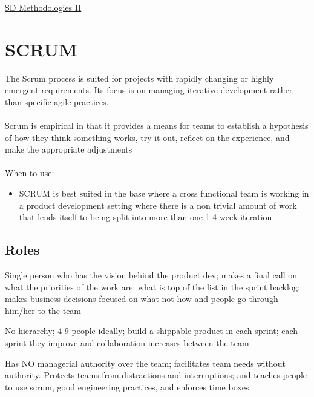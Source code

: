 \documentclass{article}[18pt]
\begin{document}
\begin{center}
\underline{\huge SD Methodologies II}
\end{center}
\section{SCRUM}
The Scrum process is suited for projects with rapidly changing or highly emergent requirements. Its focus is on managing iterative development rather than specific agile practices.\\
\\
Scrum is empirical in that it provides a means for teams to establish a hypothesis of how they think something works, try it out, reflect on the experience, and make the appropriate adjustments\\
\\
When to use:
\begin{itemize}
	\item SCRUM is best suited in the base where a cross functional team is working in a product development setting where there is a non trivial amount of work that lends itself to being split into more than one 1-4 week iteration
\end{itemize}
\subsection{Roles}
\begin{defin}
Single person who has the vision behind the product dev; makes a final call on what the priorities of the work are: what is top of the list in the sprint backlog; makes business decisions focused on what not how and people go through him/her to the team
\end{defin}

\begin{defin}
No hierarchy; 4-9 people ideally; build a shippable product in each sprint; each sprint they improve and collaboration increases between the team
\end{defin}


\begin{defin}
Has NO managerial authority over the team; facilitates team needs without authority.  Protects teams from distractions and interruptions; and teaches people to use scrum, good engineering practices, and enforces time boxes.
\end{defin}
\end{document}
